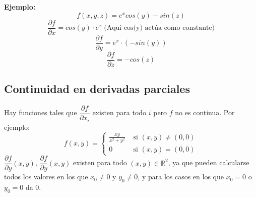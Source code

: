 \documentclass[11pt]{article}
\newcommand{\R}{\mathbb{R}}
\theoremstyle{plain}
\begin{document}
        \textbf{Ejemplo:}
        \[f(x,y,z) = e^ x cos(y) -sin(z)\]
        \[\frac{\partial f}{\partial x} = cos(y) \cdot e^x \; \text{(Aquí cos(y) actúa como constante)}\]
        \[\frac{\partial f}{\partial y} = e^x \cdot (-sin(y))\]
        \[\frac{\partial f}{\partial z} = - cos(z)\]

        \subsection{Continuidad en derivadas parciales} %
        \label{sub:continuidad_en_derivadas_parciales}
            Hay funciones tales que $\dfrac{\partial f}{\partial x_i}$ existen para todo $i$ pero $f$ no es continua. Por ejemplo: \\
                \begin{equation}
                    f(x,y) =
                    \begin{cases}
                        \frac{xy}{x^2 + y^2} &\text{ si } (x,y)\ne(0,0)\\
                        0 &\text{ si } (x,y) = (0,0)
                    \end{cases}
                \end{equation}
            $\dfrac{\partial f}{\partial y} (x,y)$, $\dfrac{\partial f}{\partial y} (x,y)$ existen para todo $(x,y) \in \R^2$, ya que pueden calcularse todos los valores en los que $x_0 \ne 0$ y $y_0 \ne 0$, y para los casos en los que $x_0 = 0$ o $y_0 = 0$ da 0. \\
\end{document}
